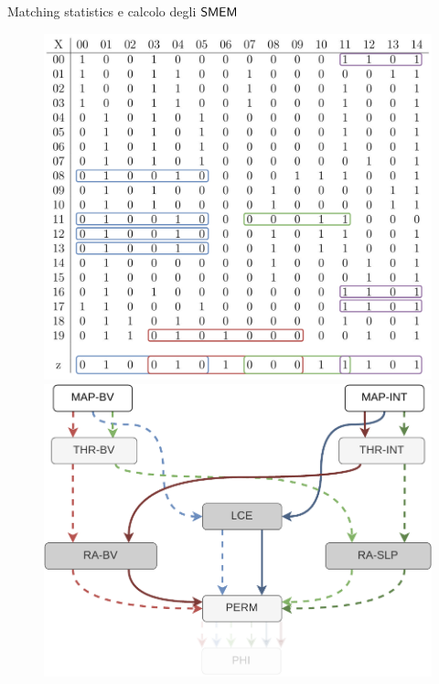 \documentclass[]{beamer}
\def\SMEM{\mbox{\rm {\sf SMEM}}}
\begin{document}
\begin{frame}{Matching statistics e calcolo degli $\SMEM$}
  \vspace{-0.3cm}
 \begin{figure}[H]
    \centering
    \includegraphics[scale = 0.21, valign=t]{img/pbwtmatch.pdf}
    \includegraphics[scale = 0.3, valign=t]{img/mini_ms4.pdf}
  \end{figure}
  \vspace{-0.5cm}
  \begin{table}[H]
    \scriptsize
    \centering
    \addtolength{\tabcolsep}{-0.12em}

\end{table}
\end{frame}
\end{document}
